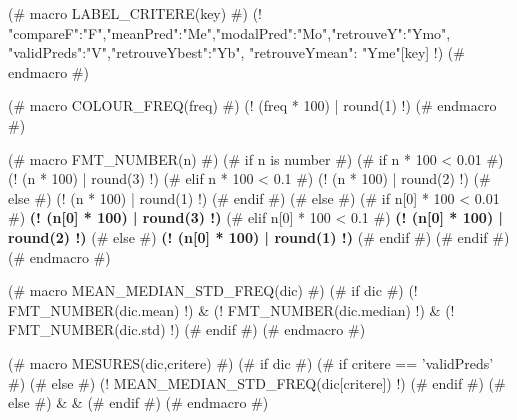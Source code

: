 (# macro LABEL_CRITERE(key) #)
{\small (! {"compareF":"F","meanPred":"Me","modalPred":"Mo","retrouveY":"Ymo",
"validPreds":"V","retrouveYbest":"Yb", "retrouveYmean": "Yme"}[key] !)  }
(# endmacro #)

(# macro COLOUR_FREQ(freq) #)
\textcolor[rgb]{ (! 2 * (1.1 - freq)  | round(3) !) , (! (2 * freq - 1.3) | round(3)  !) , 0.1}{(! (freq * 100) | round(1) !)}
(# endmacro #)

(# macro FMT_NUMBER(n) #)
    (# if n is number #)
(# if n * 100 < 0.01 #)
(! (n * 100) | round(3) !)
(# elif n * 100 < 0.1 #)
(! (n * 100) | round(2) !)
(# else #)
(! (n * 100) | round(1) !)
(# endif #)
    (# else #)
(# if n[0] * 100 < 0.01 #)
\textbf{ (! (n[0] * 100) | round(3) !)}
(# elif n[0] * 100 < 0.1 #)
\textbf{ (! (n[0] * 100) | round(2) !)}
(# else #)
\textbf{ (! (n[0] * 100) | round(1) !)}
(# endif #)
    (# endif #)
(# endmacro #)


(#  macro MEAN_MEDIAN_STD_FREQ(dic) #)
    (# if dic #)
    (! FMT_NUMBER(dic.mean) !) & {\footnotesize (! FMT_NUMBER(dic.median) !)} & {\footnotesize (! FMT_NUMBER(dic.std)  !) }
    (# endif #)
(# endmacro #)


(#  macro MESURES(dic,critere) #)
(# if dic #)
    (# if critere == 'validPreds' #)
    (# else #)
    (!  MEAN_MEDIAN_STD_FREQ(dic[critere]) !)
    (# endif #)
(# else #)
& &
(# endif #)
(# endmacro #)
